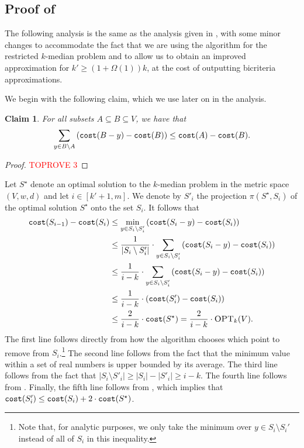 \documentclass[11pt]{article}
\newcommand{\1}{\mathmybb{1}}
\newtheorem{claim}[theorem]{Claim}
\newcommand{\proj}{\pi}
\newcommand{\OPT}{\textsc{OPT}}
\newcommand{\cost}{\textnormal{\texttt{cost}}}
\begin{document}
\subsection{Proof of }

The following analysis is the same as the analysis given in \cite{ChrobakKY06}, with some minor changes to accommodate the fact that we are using the algorithm for the restricted $k$-median problem and to allow us to obtain an improved approximation for $k' \geq (1 + \Omega(1))k$, at the cost of outputting bicriteria approximations.


We begin with the following claim, which we use later on in the analysis.

\begin{claim}\label{claim:greedy:proof}
    For all subsets $A \subseteq B \subseteq V$, we have that
    $$ \sum_{y \in B \setminus A} \left( \cost(B-y) - \cost(B) \right) \leq \cost(A) - \cost(B). $$
\end{claim}

\begin{proof}\textcolor{red}{TOPROVE 3}\end{proof}

Let $S^\star$ denote an optimal solution to the $k$-median problem in the metric space $(V,w,d)$ and let $i \in [k' + 1, m]$. We denote by $S'_i$ the projection $\proj(S^\star, S_i)$ of the optimal solution $S^\star$ onto the set $S_i$. It follows that
\begin{align*}
    \cost(S_{i-1}) - \cost(S_i) &\leq \min_{y \in S_i \setminus S'_i} \left(\cost(S_i - y) - \cost(S_i) \right)\\
    &\leq \frac{1}{|S_i \setminus S'_i|} \cdot \sum_{y \in S_i \setminus S'_i} \left(\cost(S_i - y) - \cost(S_i) \right)\\
    &\leq \frac{1}{i - k} \cdot \sum_{y \in S_i \setminus S'_i} \left(\cost(S_i - y) - \cost(S_i) \right)\\
    &\leq \frac{1}{i - k} \cdot \left(\cost(S'_i) - \cost(S_i) \right)\\
    &\leq \frac{2}{i - k} \cdot \cost(S^\star) = \frac{2}{i - k} \cdot \OPT_k(V).
\end{align*}
The first line follows directly from how the algorithm chooses which point to remove from $S_i$.\footnote{Note that, for analytic purposes, we only take the minimum over $y \in S_i \setminus S_i'$ instead of all of $S_i$ in this inequality.} The second line follows from the fact that the minimum value within a set of real numbers is upper bounded by its average. The third line follows from the fact that $|S_i \setminus S'_i| \geq |S_i| - |S'_i| \geq i - k$. 
The fourth line follows from .
Finally, the fifth line follows from , which implies that $\cost(S'_i) \leq \cost(S_i) + 2\cdot \cost(S^\star)$.
\end{document}
